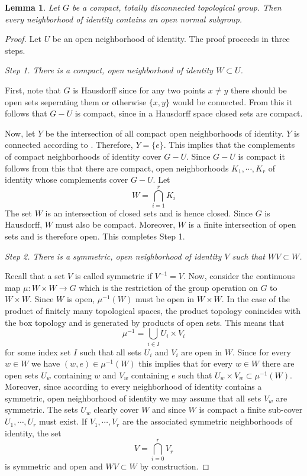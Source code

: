 \documentclass[12pt]{article}
\newtheorem{lem}[thm]{Lemma}
\theoremstyle{definition}
\theoremstyle{remark}
\begin{document}
    \begin{lem}\label{lem:ons}
        Let $G$ be a compact, totally disconnected topological group. Then every neighborhood of identity contains an open normal subgroup.
    \end{lem}

    \begin{proof}
        Let $U$ be an open neighborhood of identity. The proof proceeds in three steps.

        \noindent\emph{Step 1. There is a compact, open neighborhood of identity $W\subset U$.}

        First, note that $G$ is Hausdorff since for any two points $x\neq y$ there should be open sets seperating them or otherwise $\{x,y\}$ would be connected. From this it follows that $G-U$ is compact, since in a Hausdorff space closed sets are compact.

        Now, let $Y$ be the intersection of all compact open neighborhoods of identity. $Y$ is connected according to \cite[Lemma 1-16]{FANF1999}. Therefore, $Y=\{e\}$. This implies that the complements of compact neighborhoods of identity cover $G-U$. Since $G-U$ is compact it follows from this that there are compact, open neighborhoods $K_1,\cdots,K_r$ of identity whose complements cover $G-U$. Let
        $$
        W=\bigcap_{i=1}^r K_i
        $$
        The set $W$ is an intersection of closed sets and is hence closed. Since $G$ is Hausdorff, $W$ must also be compact. Moreover, $W$ is a finite intersection of open sets and is therefore open. This completes Step 1.
        
        \noindent\emph{Step 2. There is a symmetric, open neighborhood of identity $V$ such that $WV\subset W$.}

        Recall that a set $V$ is called symmetric if $V^{-1}=V$. Now, consider the continuous map $\mu\colon W\times W \to G$ which is the restriction of the group operation on $G$ to $W \times W$. Since $W$ is open, $\mu^{-1}(W)$ must be open in $W \times W$. In the case of the product of finitely many topological spaces, the product topology conincides with the box topology and is generated by products of open sets. This means that
        $$ \mu^{-1} = \bigcup_{i \in I} U_i \times V_i $$
        for some index set $I$ such that all sets $U_i$ and $V_i$ are open in $W$. Since for every $w \in W$ we have $(w,e)\in\mu^{-1}(W)$ this implies that for every $w\in W$ there are open sets $U_w$ containing $w$ and $V_w$ containing $e$ such that $U_w\times V_w\subset \mu^{-1}(W)$. Moreover, since according to \cite[Proposition 1-1(ii)]{FANF1999} every neighborhood of identity contains a symmetric, open neighborhood of identity we may assume that all sets $V_w$ are symmetric. The sets $U_w$ clearly cover $W$ and since $W$ is compact a finite sub-cover $U_1,\cdots,U_r$ must exist. If $V_1,\cdots,V_r$ are the associated symmetric neighborhoods of identity, the set
        $$ V = \bigcap_{i=0}^r V_r $$
        is symmetric and open and $WV\subset W$ by construction.


\end{proof}
\end{document}
